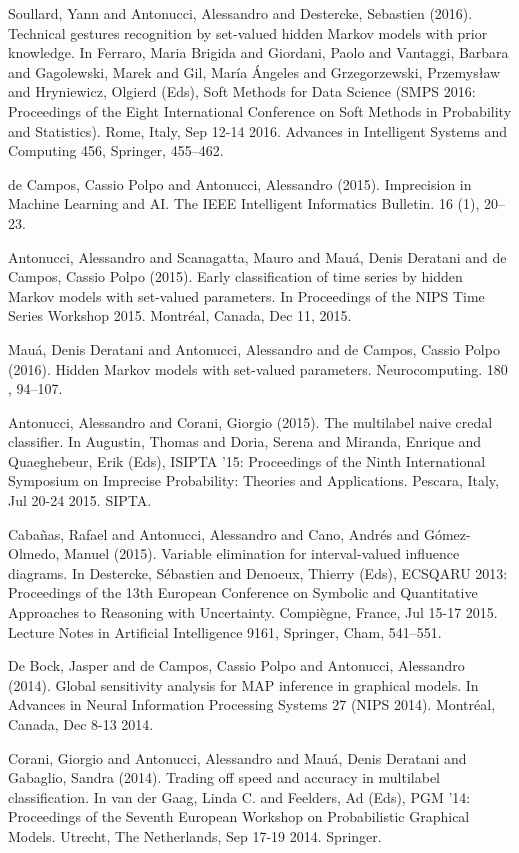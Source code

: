 \begin{cventries}
\begin{cvitems}
\item Soullard, Yann and Antonucci, Alessandro and Destercke, Sebastien (2016).   Technical gestures recognition by set-valued hidden Markov models with prior knowledge.   In Ferraro, Maria Brigida and Giordani, Paolo and Vantaggi, Barbara and Gagolewski, Marek and Gil, María Ángeles and Grzegorzewski, Przemysław and Hryniewicz, Olgierd (Eds), Soft Methods for Data Science (SMPS 2016: Proceedings of the Eight International Conference on Soft Methods in Probability and Statistics).   Rome, Italy, Sep 12-14 2016.   Advances in Intelligent Systems and Computing 456, Springer, 455–462.
\item de Campos, Cassio Polpo and Antonucci, Alessandro (2015).   Imprecision in Machine Learning and AI.   The IEEE Intelligent Informatics Bulletin. 16 (1), 20–23.
\item Antonucci, Alessandro and Scanagatta, Mauro and Mauá, Denis Deratani and de Campos, Cassio Polpo (2015).   Early classification of time series by hidden Markov models with set-valued parameters.   In Proceedings of the NIPS Time Series Workshop 2015.   Montréal, Canada,   Dec 11, 2015.
\item Mauá, Denis Deratani and Antonucci, Alessandro and de Campos, Cassio Polpo (2016).   Hidden Markov models with set-valued parameters.   Neurocomputing. 180 , 94–107.
\item Antonucci, Alessandro and Corani, Giorgio (2015).   The multilabel naive credal classifier.   In Augustin, Thomas and Doria, Serena and Miranda, Enrique and Quaeghebeur, Erik (Eds), ISIPTA ’15: Proceedings of the Ninth International Symposium on Imprecise Probability: Theories and Applications.   Pescara, Italy,   Jul 20-24 2015.   SIPTA.
\item Cabañas, Rafael and Antonucci, Alessandro and Cano, Andrés and Gómez-Olmedo, Manuel (2015).   Variable elimination for interval-valued influence diagrams.   In Destercke, Sébastien and Denoeux, Thierry (Eds), ECSQARU 2013: Proceedings of the 13th European Conference on Symbolic and Quantitative Approaches to Reasoning with Uncertainty.   Compiègne, France, Jul 15-17 2015.   Lecture Notes in Artificial Intelligence 9161, Springer, Cham, 541–551.
\item De Bock, Jasper and de Campos, Cassio Polpo and Antonucci, Alessandro (2014).   Global sensitivity analysis for MAP inference in graphical models.   In Advances in Neural Information Processing Systems 27 (NIPS 2014).   Montréal, Canada,   Dec 8-13 2014.
\item Corani, Giorgio and Antonucci, Alessandro and Mauá, Denis Deratani and Gabaglio, Sandra (2014).   Trading off speed and accuracy in multilabel classification.   In van der Gaag, Linda C. and Feelders, Ad (Eds), PGM ’14: Proceedings of the Seventh European Workshop on Probabilistic Graphical Models.   Utrecht, The Netherlands,   Sep 17-19 2014.   Springer.

\end{cvitems}
\end{cventries}
